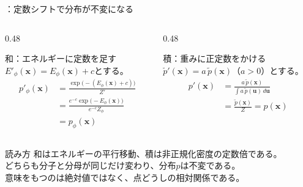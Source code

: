 \begin{frame}{\supplmark：定数シフトで分布が不変になる}
    \begin{columns}[T,onlytextwidth]
        \begin{column}{0.48\textwidth}
            \begin{exampleblock}{和：エネルギーに定数を足す}
                $E'_\phi(\bm{x})=E_\phi(\bm{x})+c$とする。
                \vspace{-0.3em}
                \begin{align*}
                    p'_\phi(\bm{x})
                    &=
                    \frac{\exp\!\bigl(-(E_\phi(\bm{x})+c)\bigr)}{Z'}\\[2pt]
                    &=
                    \frac{e^{-c}\exp\!\bigl(-E_\phi(\bm{x})\bigr)}{e^{-c}Z_\phi}\\[2pt]
                    &=
                    p_\phi(\bm{x})
                \end{align*}
            \end{exampleblock}
        \end{column}
        \begin{column}{0.48\textwidth}
            \begin{exampleblock}{積：重みに正定数をかける}
                $\tilde{p}'(\bm{x})=a\,\tilde{p}(\bm{x})$（$a>0$）とする。
                \vspace{-0.3em}
                \[
                    \begin{aligned}
                    p'(\bm{x})
                    &=
                    \frac{a\,\tilde{p}(\bm{x})}{\int a\,\tilde{p}(\bm{u})\,d\bm{u}}\\[2pt]
                    &=
                    \frac{\tilde{p}(\bm{x})}{Z}
                    =
                    p(\bm{x})
                    \end{aligned}
                \]
            \end{exampleblock}
        \end{column}
    \end{columns}
    \vspace{0.2em}
    \begin{exampleblock}{読み方}
        和はエネルギーの平行移動、積は非正規化密度の定数倍である。\\
        どちらも分子と分母が同じだけ変わり、分布$p$は不変である。\\
        意味をもつのは絶対値ではなく、点どうしの相対関係である。
    \end{exampleblock}
\end{frame}
